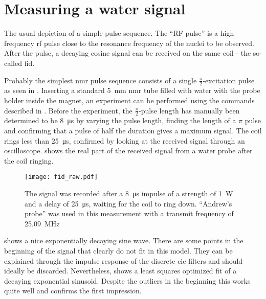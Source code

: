 \section{Measuring a water signal}

\begin{marginfigure}
    \centering
    
    \caption{ The usual depiction of a simple pulse sequence. The \enquote{RF pulse} is a high frequency \acrshort{rf} pulse close to the resonance frequency of the nuclei to be observed. After the pulse, a decaying cosine signal can be received on the same coil -  the so-called \acrfull{fid}.}
\end{marginfigure}

Probably the simplest \acrshort{nmr} pulse sequence consists of a single \(\frac{\pi}{2}\)-excitation pulse as seen in . Inserting a standard \qty{5}{\milli\metre} \acrshort{nmr} tube filled with water with the probe holder inside the magnet, an experiment can be performed using the commands described in . Before the experiment, the \(\frac{\pi}{2}\)-pulse length has manually been determined to be \qty{8}{\micro\second} by varying the pulse length, finding the length of a \(\pi\) pulse and confirming that a pulse of half the duration gives a maximum signal. The coil rings less than \qty{25}{\micro\second}, confirmed by looking at the received signal through an oscilloscope.  shows the real part of the received signal from a water probe after the coil ringing.

\begin{figure}[h!bt]
    \centering
    \texttt{[image: fid\_raw.pdf]}
    \caption{ The signal was recorded after a \qty{8}{\micro\second} impulse of a strength of \qty{1}{\watt} and a delay of \qty{25}{\micro\second}, waiting for the coil to ring down. \enquote{Andrew's probe} was used in this measurement with a transmit frequency of \qty{25.09}{\mega\hertz}}
\end{figure}

 shows a nice exponentially decaying sine wave. There are some points in the beginning of the signal that clearly do not fit in this model. They can be explained through the impulse response of the discrete \acrshort{cic} filters and should ideally be discarded. Nevertheless,  shows a least squares optimized fit of a decaying exponential sinusoid. Despite the outliers in the beginning this works quite well and confirms the first impression.


